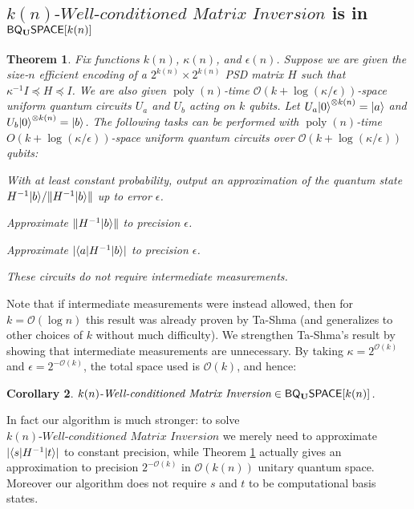 \documentclass[11pt]{article}
\newtheorem{theorem}{Theorem}
\newtheorem{corollary}[theorem]{Corollary}
\theoremstyle{definition}
\theoremstyle{remark}
\newcommand\matrixinvert[1]{{\ensuremath{#1}}\textit{-Well-conditioned Matrix Inversion}}
\newcommand{\classfont}{\sf}
\newcommand{\Unitary}{\mathbf{U}}
\newcommand{\unitaryBQSPACE}[1]{{\classfont{BQ}_\Unitary\classfont{SPACE}}[#1]}
\newcommand\bigoh{\mathcal{O}}
\DeclareMathOperator{\poly}{poly}
\begin{document}
\subsection{$\matrixinvert{k(n)}$ is in $\unitaryBQSPACE{k(n)}$} \label{sec: matrix inversion alg}
\begin{theorem} \label{thm: matrix inversion alg}
Fix functions $k(n)$, $\kappa(n)$, and $\epsilon(n)$. Suppose we are given the size-$n$ efficient encoding of a $2^{k(n)} \times 2^{k(n)}$ PSD matrix $H$ such that $\kappa^{-1} I \preceq H \preceq I$. We are also given $\poly(n)$-time $\mathcal{O}(k+\log(\kappa/\epsilon))$-space uniform quantum circuits $U_a$ and $U_b$ acting on $k$ qubits. Let $U_a{\left\vert{0}\right\rangle}^{\otimes k(n)} = {\left\vert{a}\right\rangle}$ and $U_b{\left\vert{0}\right\rangle}^{\otimes k(n)} = {\left\vert{b}\right\rangle}$. The following tasks can be performed with $\poly(n)$-time $O(k+\log(\kappa/\epsilon))$-space uniform quantum circuits over $\bigoh (k+\log(\kappa/\epsilon))$ qubits:
\begin{compactenum}
\item With at least constant probability, output an approximation of the quantum state $H^{-1}{\left\vert{b}\right\rangle} / \|H^{-1}{\left\vert{b}\right\rangle}\|$ up to error $\epsilon$.
\item Approximate $\|H^{-1}{\left\vert{b}\right\rangle}\|$ to precision $\epsilon$.
\item Approximate $|{\left\langle{a}\right\vert}H^{-1}{\left\vert{b}\right\rangle}|$ to precision $\epsilon$.
\end{compactenum}
These circuits do not require intermediate measurements.
\end{theorem}
Note that if intermediate measurements were instead allowed, then for $k = \mathcal{O}(\log n)$ this result was already proven by Ta-Shma \cite[Theorem~6.3]{tashma} (and generalizes to other choices of $k$ without much difficulty). We strengthen Ta-Shma's result by showing that intermediate measurements are unnecessary. By taking $\kappa = 2^{\bigoh (k)}$ and $\epsilon = 2^{-\bigoh (k)}$, the total space used is $\bigoh(k)$, and hence:

\begin{corollary}
$\matrixinvert{k(n)} \in \unitaryBQSPACE{k(n)}$.
\end{corollary}
In fact our algorithm is much stronger: to solve $\matrixinvert{k(n)}$ we merely need to approximate $|{\left\langle{s}\right\vert}H^{-1}{\left\vert{t}\right\rangle}|$ to constant precision, while Theorem \ref{thm: matrix inversion alg} actually gives an approximation to precision $2^{-\bigoh (k)}$ in $\bigoh (k(n))$ unitary quantum space. Moreover our algorithm does not require $s$ and $t$ to be computational basis states.
\end{document}
